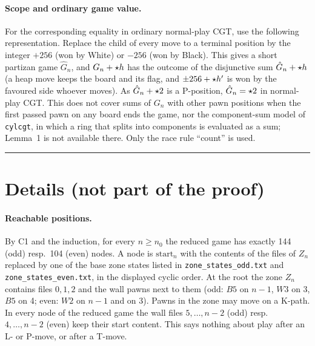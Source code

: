 \begin{wallproof}
\paragraph{Scope and ordinary game value.}
For the corresponding equality in ordinary normal-play CGT, use the following representation. Replace the child of every move
to a terminal position by the integer $+256$ (won by White) or $-256$ (won by Black). This gives a short partizan game $\hat G_n$, and
$G_n+\mathord{\star h}$ has the outcome of the disjunctive sum $\hat G_n+\mathord{\star h}$ (a heap move keeps the board and its flag, and $\pm256+\mathord{\star h'}$ is won
by the favoured side whoever moves). As $\hat G_n+\mathord{\star2}$ is a P-position, $\hat G_n=\mathord{\star2}$ in normal-play CGT. This does not cover sums of
$G_n$ with other pawn positions when the first passed pawn on any board ends the game, nor the component-sum model of \texttt{cylcgt},
in which a ring that splits into components is evaluated as a sum; Lemma~1 is not available there. Only the race rule ``count'' is used.
\end{wallproof}

\bigskip\hrule\bigskip
\section*{Details (not part of the proof)}

\paragraph{Reachable positions.} By C1 and the induction, for every $n\ge n_0$ the reduced game has exactly 144 (odd) resp.\ 104 (even)
nodes. A node is $\mathrm{start}_n$ with the contents of the files of $Z_n$ replaced by one of the base zone states listed in \texttt{zone\_states\_odd.txt} and \texttt{zone\_states\_even.txt}, in the displayed cyclic order. At the root the zone $Z_n$ contains files $0,1,2$ and the wall pawns next to them (odd: $B5$ on $n-1$, $W3$ on 3, $B5$ on 4; even: $W2$ on $n-1$ and
on 3). Pawns in the zone may move on a K-path. In every node of the reduced game the wall files $5,\dots,n-2$ (odd) resp.\ $4,\dots,n-2$ (even) keep their start content. This
says nothing about play after an L- or P-move, or after a T-move.

